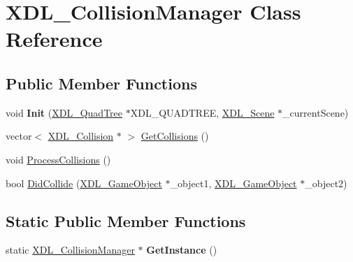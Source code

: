 \hypertarget{class_x_d_l___collision_manager}{\section{X\-D\-L\-\_\-\-Collision\-Manager Class Reference}
\label{class_x_d_l___collision_manager}
}
\subsection*{Public Member Functions}
\begin{DoxyCompactItemize}
\item 
\hypertarget{class_x_d_l___collision_manager_a1089f9aebb1eb317216c65f9b76ddc71}{void {\bfseries Init} (\hyperlink{class_x_d_l___quad_tree}{X\-D\-L\-\_\-\-Quad\-Tree} $\ast$X\-D\-L\-\_\-\-Q\-U\-A\-D\-T\-R\-E\-E, \hyperlink{class_x_d_l___scene}{X\-D\-L\-\_\-\-Scene} $\ast$\-\_\-current\-Scene)}\label{class_x_d_l___collision_manager_a1089f9aebb1eb317216c65f9b76ddc71}

\item 
vector$<$ \hyperlink{class_x_d_l___collision}{X\-D\-L\-\_\-\-Collision} $\ast$ $>$ \hyperlink{class_x_d_l___collision_manager_a953cb007485912476a0458699d9dcefb}{Get\-Collisions} ()
\item 
void \hyperlink{class_x_d_l___collision_manager_ace85075608a0770f19c5e7564fe21619}{Process\-Collisions} ()
\item 
bool \hyperlink{class_x_d_l___collision_manager_a955e10a7dcbbfa65cfaaa79b7c2d815b}{Did\-Collide} (\hyperlink{class_x_d_l___game_object}{X\-D\-L\-\_\-\-Game\-Object} $\ast$\-\_\-object1, \hyperlink{class_x_d_l___game_object}{X\-D\-L\-\_\-\-Game\-Object} $\ast$\-\_\-object2)
\end{DoxyCompactItemize}
\subsection*{Static Public Member Functions}
\begin{DoxyCompactItemize}
\item 
\hypertarget{class_x_d_l___collision_manager_a25b679af6515171c6f16fc14262c7004}{static \hyperlink{class_x_d_l___collision_manager}{X\-D\-L\-\_\-\-Collision\-Manager} $\ast$ {\bfseries Get\-Instance} ()}\label{class_x_d_l___collision_manager_a25b679af6515171c6f16fc14262c7004}

\end{DoxyCompactItemize}


